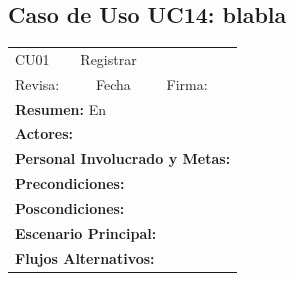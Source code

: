 
\subsection{Caso de Uso UC14: blabla}

\begin{longtable}{|l|p{5.5cm}|l|p{2cm}|l|p{1.9cm}|} \hline
    \cellcolor{grisOscuro} CU01 & \multicolumn{4}{|l|}{  \cellcolor{grisOscuro} Registrar} &  \cellcolor{grisClaro}\multirow{2}{1cm}{} \\ \cline{1-5}
    \cellcolor{grisOscuro} Revisa: &  \cellcolor{grisClaro} &  \cellcolor{grisOscuro} Fecha &  \cellcolor{grisClaro} &  \cellcolor{grisOscuro} Firma: & \cellcolor{grisClaro} \\ \hline
    \multicolumn{6}{|p{15cm}|}{ \textbf{Resumen: } En

    } \\ \hline

    \multicolumn{6}{|p{15cm}|}{ \textbf{Actores: }

    } \\ \hline

    \multicolumn{6}{|p{15cm}|}{ \textbf{Personal Involucrado y Metas: }

    } \\ \hline

    \multicolumn{6}{|p{15cm}|}{ \textbf{Precondiciones: }

    } \\ \hline

    \multicolumn{6}{|p{15cm}|}{ \textbf{Poscondiciones: }

    } \\ \hline

    \multicolumn{6}{|p{15cm}|}{ \textbf{Escenario Principal: }

    } \\ \hline

    \multicolumn{6}{|p{15cm}|}{ \textbf{Flujos Alternativos: }

    } \\ \hline

\end{longtable}


